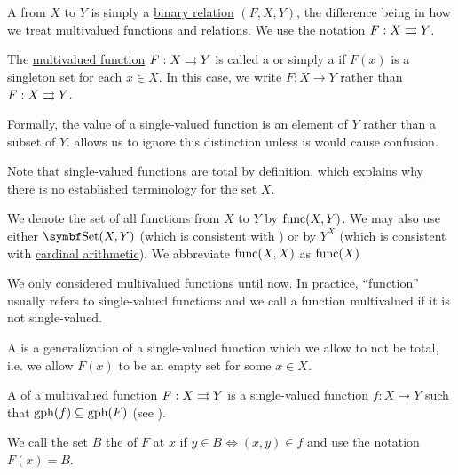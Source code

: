 \begin{definition}\label{def:function}
  A  from \( X \) to \( Y \) is simply a \hyperref[def:binary_relation]{binary relation} \( (F, X, Y) \), the difference being in how we treat multivalued functions and relations. We use the notation \( F: X \rightrightarrows Y \).

  \begin{DefEnum}[series=def:function]
     The \hyperref[def:function/multivalued]{multivalued function} \( F: X \rightrightarrows Y \) is called a  or simply a  if \( F(x) \) is a \hyperref[remark:singleton_sets]{singleton set} for each \( x \in X \). In this case, we write \( F: X \to Y \) rather than \( F: X \rightrightarrows Y \).

    Formally, the value of a single-valued function is an element of \( Y \) rather than a subset of \( Y \).  allows us to ignore this distinction unless is would cause confusion.

    Note that single-valued functions are total by definition, which explains why there is no established terminology for the set \( X \).

    We denote the set of all functions from \( X \) to \( Y \) by \( \operatorname{func}(X, Y) \). We may also use either \( \Cat{Set}(X, Y) \) (which is consistent with ) or by \( Y^X \) (which is consistent with \hyperref[def:cardinal_arithmetic]{cardinal arithmetic}). We abbreviate \( \operatorname{func}(X, X) \) as \( \operatorname{func}(X) \)

     We only considered multivalued functions until now. In practice, \enquote{function} usually refers to single-valued functions and we call a function multivalued if it is not single-valued.

     A  is a generalization of a single-valued function which we allow to not be total, i.e. we allow \( F(x) \) to be an empty set for some \( x \in X \).

     A  of a multivalued function \( F: X \rightrightarrows Y \) is a single-valued function \( f: X \to Y \) such that \( \operatorname{gph}(f) \subseteq \operatorname{gph}(F) \) (see ).

     We call the set \( B \) the  of \( F \) at \( x \) if \( y \in B \iff (x, y) \in f \) and use the notation \( F(x) = B \).


\end{DefEnum}
\end{definition}
